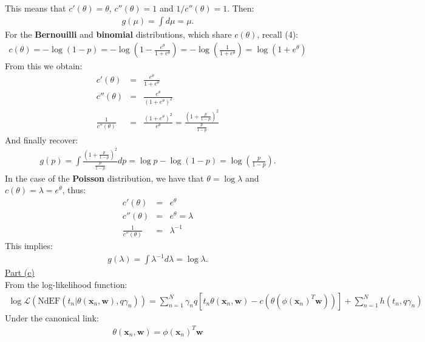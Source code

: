 \documentclass[a4paper, 11pt]{article}
\begin{document}
This means that $c'(\theta) = \theta$, $c''(\theta) = 1$ and $1/c''(\theta) = 1$. Then:
\begin{eqnarray}
g(\mu) = \int d\mu = \mu. \nonumber
\end{eqnarray}
For the \textbf{Bernouilli} and \textbf{binomial} distributions, which share $c(\theta)$, recall (4):
\begin{eqnarray}
c(\theta) = -\log{(1-p)} = -\log{\left( 1 - \frac{e^\theta}{1+e^\theta} \right)} = -\log{\left( \frac{1}{1+e^\theta} \right)} = \log{(1 + e^\theta)} \nonumber
\end{eqnarray}
From this we obtain:
\begin{eqnarray}
c'(\theta) &=& \frac{e^\theta}{1 + e^\theta} \nonumber \\
c''(\theta) &=& \frac{e^\theta}{(1 + e^\theta)^2}\nonumber \\
\frac{1}{c''(\theta)} &=& \frac{(1 + e^\theta)^2}{e^\theta} = \frac{\left(1 + \frac{p}{1-p}\right)^2}{\frac{p}{1-p}} \nonumber
\end{eqnarray}
And finally recover:
\begin{eqnarray}
g(p) = \int \frac{(1 + \frac{p}{1-p})^2}{\frac{p}{1-p}} dp = \log p - \log{(1-p)} = \log{\left(\frac{p}{1-p}\right)}. \nonumber
\end{eqnarray}
In the case of the \textbf{Poisson} distribution, we have that $\theta = \log \lambda$ and $c(\theta) = \lambda = e^{\theta}$, thus:
\begin{eqnarray}
c'(\theta) &=& e^{\theta} \nonumber \\
c''(\theta) &=& e^{\theta}  = \lambda \nonumber \\
\frac{1}{c''(\theta)} &=& \lambda^{-1} \nonumber
\end{eqnarray}
This implies:
\begin{eqnarray}
g(\lambda) = \int \lambda^{-1} d\lambda = \log \lambda. \nonumber
\end{eqnarray}
\newline \underline{Part (c)}\\
\newline From the log-likelihood function:
\begin{eqnarray}
\log \mathcal{L} \left( \text{NdEF}( t_n | \theta (\mathbf{x}_n, \mathbf{w}), q \gamma_n ) \right) = \sum_{n=1}^{N} \gamma_n q [ t_n \theta( \mathbf{x}_n, \mathbf{w}) - c(\theta(\phi(\mathbf{x}_n)^T \mathbf{w})) ] + \sum_{n=1}^{N} h(t_n, q \gamma_n) \nonumber
\end{eqnarray}
Under the canonical link:
\begin{eqnarray}
\theta(\mathbf{x}_n, \mathbf{w}) = \phi(\mathbf{x}_n)^T \mathbf{w} \nonumber
\end{eqnarray}
\end{document}
